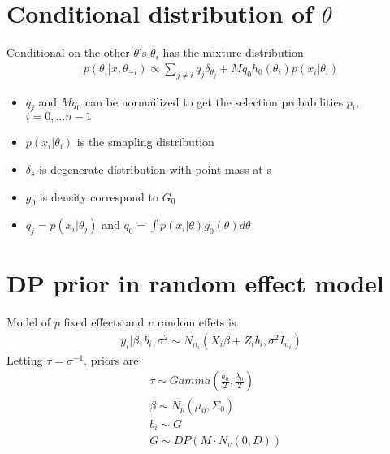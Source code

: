 \documentclass[11pt]{article}
\begin{document}
\section{Conditional distribution of $\theta$}
Conditional on the other $\theta$'s $\theta_i$ has the mixture distribution
\begin{align*}
p(\theta_i | x , \theta_{-i}) \propto \sum_{j\ne i}q_j \delta_{\theta_j} + Mq_0h_0(\theta_i)p(x_i|\theta_i)
\end{align*}
\begin{itemize}
	\item $q_j$ and $Mq_0$ can be normailized to get the selection probabilities $p_i$, $i=0,\dots n-1$
	\item $p(x_i|\theta_i)$ is the smapling distribution
	\item $\delta_s$ is degenerate distribution with point mass at s
	\item $g_0$ is density correspond to $G_0$
	\item $q_j = p(x_i | \theta_j)$ and $q_0 = \int p(x_i |\theta)g_0(\theta)d\theta$
\end{itemize}
\section{DP prior in random effect model}
Model of $p$ fixed effects and $v$ random effets is
\begin{align*}
y_i | \beta,b_i,\sigma^2 \sim N_{n_i}(X_i \beta + Z_i b_i , \sigma^2 I_{n_i})
\end{align*}
Letting $\tau = \sigma^{-1}$. priors are
\begin{align*}
&\tau \sim Gamma\left(\frac{a_0}{2},\frac{\lambda_0}{2}\right)\\
&\beta \sim N_p(\mu_0,\Sigma_0)\\
&b_i \sim G\\
&G \sim DP(M\cdot N_v(0,D))
\end{align*}
\end{document}
